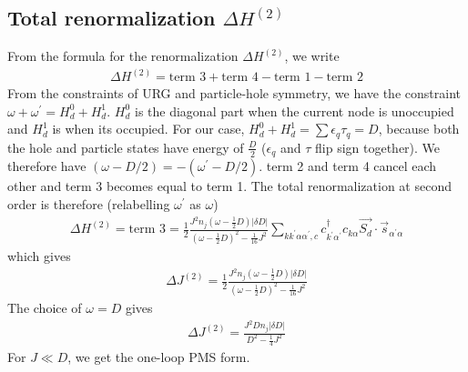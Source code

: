 \documentclass{revtex4-2}
\begin{document}
\subsection{Total renormalization \(\Delta H^{(2)}\)}
From the formula for the renormalization \(\Delta H^{(2)}\), we write
\begin{equation}\begin{aligned}
	\Delta H^{(2)} = \text{term 3} + \text{term 4} - \text{term 1} - \text{term 2}
\end{aligned}\end{equation}
From the constraints of URG and particle-hole symmetry, we have the constraint \(\omega + \omega^\prime = H_d^0 + H_d^1\). \(H_d^0\) is the diagonal part when the current node is unoccupied and \(H_d^1\) is when its occupied. For our case, \(H_d^0 + H_d^1 = \sum \epsilon_q \tau_q = D\), because both the hole and particle states have energy of \(\frac{D}{2}\) (\(\epsilon_q\) and \(\tau\) flip sign together). We therefore have \((\omega - D/2) = -(\omega^\prime - D/2)\). term 2 and term 4 cancel each other and term 3 becomes equal to term 1. The total renormalization at second order is therefore (relabelling \(\omega^\prime\) as \(\omega\))
\begin{equation}\begin{aligned}
	\Delta H^{(2)} = \text{term 3} = \frac{1}{2}\frac{J^2 n_j \left(\omega - \frac{1}{2}D\right)|\delta D|}{\left(\omega - \frac{1}{2}D\right)^2 - \frac{1}{16}J^2} \sum_{k k^\prime \alpha \alpha^\prime,c} c^\dagger_{k^\prime\alpha^\prime} c_{k\alpha} \vec{S_d}\cdot\vec{s}_{\alpha^\prime \alpha}
\end{aligned}\end{equation}
which gives
\begin{equation}\begin{aligned}
	\Delta J^{(2)} = \frac{1}{2}\frac{J^2 n_j \left(\omega - \frac{1}{2}D\right)|\delta D|}{\left(\omega - \frac{1}{2}D\right)^2 - \frac{1}{16}J^2}
\end{aligned}\end{equation}
The choice of \(\omega = D\) gives
\begin{equation}\begin{aligned}
	\Delta J^{(2)} = \frac{J^2 D  n_j |\delta D|}{D^2 - \frac{1}{4}J^2}
\end{aligned}\end{equation}
For \(J \ll D\), we get the one-loop PMS form.
\end{document}
